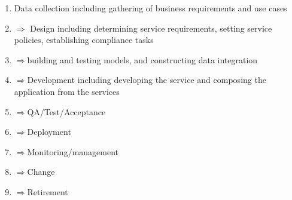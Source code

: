 \documentclass[12pt]{article}
\begin{document}
\begin{enumerate}
\item Data collection including gathering of business requirements and use cases
\item $\Longrightarrow$ Design including determining service requirements, setting service policies, establishing compliance tasks
\item $\Longrightarrow$building and testing models, and constructing data integration
\item $\Longrightarrow$Development including developing the service and composing the application from the services 
\item $\Longrightarrow$QA/Test/Acceptance  
\item $\Longrightarrow$Deployment 
\item $\Longrightarrow$Monitoring/management 
\item $\Longrightarrow$Change 
\item $\Longrightarrow$Retirement 
\end{enumerate}
	
\end{document}
